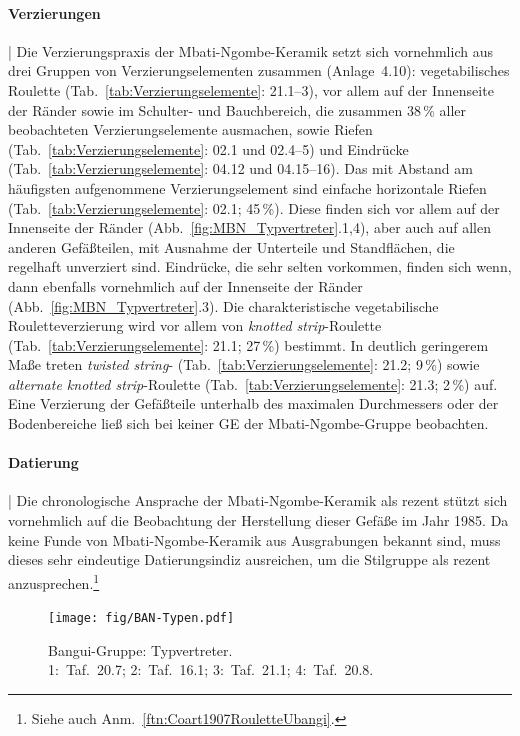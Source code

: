 \paragraph{Verzierungen}\hspace{-.5em}|\hspace{.5em}%
Die Verzierungspraxis der Mbati-Ngombe-Keramik setzt sich vornehmlich aus drei Gruppen von Verzierungselementen zusammen (Anlage~4.10): vegetabilisches \mbox{Roulette} (Tab.~\ref{tab:Verzierungselemente}: 21.1--3), vor allem auf der Innenseite der Ränder sowie im Schulter- und Bauchbereich, die zusammen 38\,\% aller beobachteten Verzierungselemente ausmachen, sowie Riefen (Tab.~\ref{tab:Verzierungselemente}: 02.1 und 02.4--5) und Eindrücke (Tab.~\ref{tab:Verzierungselemente}: 04.12 und 04.15--16). Das mit Abstand am häufigsten aufgenommene Verzierungselement sind einfache horizontale Riefen (Tab.~\ref{tab:Verzierungselemente}: 02.1; 45\,\%). Diese finden sich vor allem auf der Innenseite der Ränder (Abb.~\ref{fig:MBN_Typvertreter}.1,4), aber auch auf allen anderen Gefäßteilen, mit Ausnahme der Unterteile und Standflächen, die regelhaft unverziert sind. Eindrücke, die sehr selten vorkommen, finden sich wenn, dann ebenfalls vornehmlich auf der Innenseite der Ränder (Abb.~\ref{fig:MBN_Typvertreter}.3). Die charakteristische vegetabilische Rouletteverzierung wird vor allem von \textit{knotted strip}-Roulette (Tab.~\ref{tab:Verzierungselemente}: 21.1; 27\,\%) bestimmt. In deutlich geringerem Maße treten \textit{twisted string}- (Tab.~\ref{tab:Verzierungselemente}: 21.2; 9\,\%) sowie \textit{alternate knotted strip}-Roulette (Tab.~\ref{tab:Verzierungselemente}: 21.3; 2\,\%) auf. Eine Verzierung der Gefäßteile unterhalb des maximalen Durchmessers oder der Bodenbereiche ließ sich bei keiner GE der Mbati-Ngombe-Gruppe beobachten.


\paragraph{Datierung}\hspace{-.5em}|\hspace{.5em}%
Die chronologische Ansprache der Mbati-Ngombe-Keramik als rezent stützt sich vornehmlich auf die Beobachtung der Herstellung dieser Gefäße im Jahr 1985. Da keine Funde von Mbati-Ngombe-Keramik aus Ausgrabungen bekannt sind, muss dieses sehr eindeutige Datierungsindiz ausreichen, um die Stilgruppe als rezent anzusprechen.\footnote{Siehe auch Anm.~\ref{ftn:Coart1907RouletteUbangi}.}

\begin{figure}[tb]
	\begin{minipage}[b]{.2\textwidth}
		\caption{Bangui-Gruppe: Typvertreter.\\1:~Taf.~20.7; 2:~Taf.~16.1; 3:~Taf.~21.1; 4:~Taf.~20.8.}
		\label{fig:BAN_Typen}
	\end{minipage}\hfill
	\begin{minipage}[b]{.8\textwidth}
		\texttt{[image: fig/BAN-Typen.pdf]}
	\end{minipage}
\end{figure}

